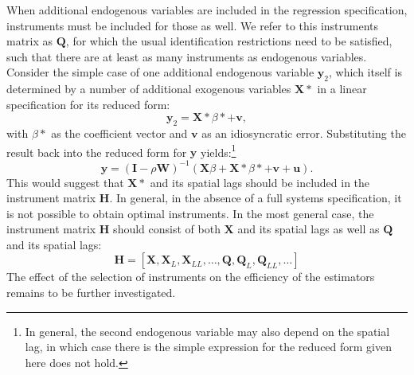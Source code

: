 \documentclass{article}
\begin{document}
When additional endogenous variables are included in the regression specification,
instruments must be included for those as well. We refer to this instruments
matrix as $\mathbf{Q}$, for which the usual identification restrictions need to be
satisfied, such that there are at least as many instruments as endogenous
variables. Consider the simple case of one additional endogenous variable $\mathbf{y}_2$,
which itself is determined by a number of additional exogenous variables $\mathbf{X*}$ in
a linear specification for its reduced form:
\begin{equation*}
 \mathbf{y}_2 = \mathbf{X*} \beta* + \mathbf{v},
\end{equation*}
with $\beta*$ as the coefficient vector and $\mathbf{v}$ as an idiosyncratic error.
Substituting the result back into the reduced form for $\mathbf{y}$ yields:\footnote{In 
general, the second endogenous variable may also depend on the spatial lag, in
which case there is the simple expression for the reduced form given here does
not hold.}
\begin{equation*}
 \mathbf{y} = (\mathbf{I} - \rho \mathbf{W} )^{-1} (\mathbf{X}\beta + \mathbf{X*} \beta* + \mathbf{v} + \mathbf{u}).
\end{equation*}
This would suggest that $\mathbf{X*}$ and its spatial lags should be included
in the instrument matrix $\mathbf{H}$. In general, in the absence of a full systems
specification, it is not possible to obtain optimal instruments. In the most general
case, the instrument matrix $\mathbf{H}$ should consist of both $\mathbf{X}$ and
its spatial lags as well as $\mathbf{Q}$ and its spatial lags:
\begin{equation*}
 \mathbf{H} = [ \mathbf{X}, \mathbf{X}_L, \mathbf{X}_{LL}, \dots, \mathbf{Q}, \mathbf{Q}_L, \mathbf{Q}_{LL}, \dots ]
\end{equation*}
The effect of the selection of instruments on the efficiency of the estimators
remains to be further investigated.
\end{document}
